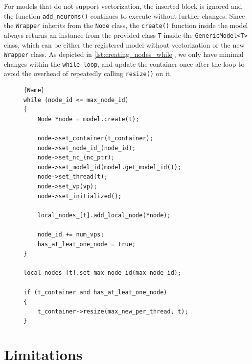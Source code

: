 For models that do not support vectorization, the inserted block is ignored and the function \texttt{add\_neurons()}  continues to execute without further changes. Since the \texttt{Wrapper} inherits from the \texttt{Node} class, the \texttt{create()} function inside the model always returns an instance from the provided class \texttt{T} inside the \texttt{GenericModel<T>} class, which can be either the registered model without vectorization or the new \texttt{Wrapper} class. As depicted in \autoref{lst:creating_nodes_while}, we only have minimal changes within the \texttt{while-loop}, and update the container once after the loop to avoid the overhead of repeatedly calling \texttt{resize()} on it.\\

\begin{figure}

\begin{lstlisting}[caption=Creating nodes,frame=tlrb, label=lst:creating_nodes_while]{Name}
while (node_id <= max_node_id)
{
    Node *node = model.create(t);

    node->set_container(t_container);
    node->set_node_id_(node_id);
    node->set_nc_(nc_ptr);
    node->set_model_id(model.get_model_id());
    node->set_thread(t);
    node->set_vp(vp);
    node->set_initialized();

    local_nodes_[t].add_local_node(*node);

    node_id += num_vps;
    has_at_leat_one_node = true;
}

local_nodes_[t].set_max_node_id(max_node_id);

if (t_container and has_at_leat_one_node)
{
    t_container->resize(max_new_per_thread, t);
}
\end{lstlisting}
\end{figure}

\section{Limitations}

